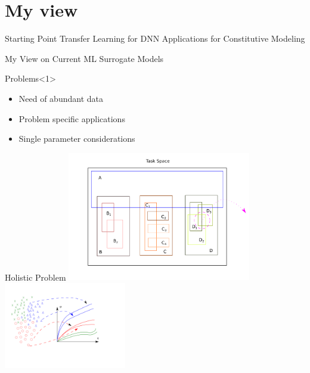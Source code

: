 \section{My view}

\begin{frame}{Starting Point}
  \centering
    \color{Pink} Transfer Learning for DNN Applications for Constitutive Modeling 
\end{frame}

\begin{frame}{My View on Current ML Surrogate Models}
\begin{minipage}{0.45\textwidth}
  \begin{block}{\color{White} Problems}<1>
    \begin{itemize}
      \item <1> Need of abundant data
      \item <1> Problem specific applications 
      \item <1> Single parameter considerations
    \end{itemize}
  \end{block} 
\end{minipage}%
\hspace{1cm}
\end{frame}

\begin{frame}{Holistic Problem}
\centering
\includegraphics[width=0.6\textwidth]{Figures/myview/tasks.pdf}\includegraphics[width=0.4\textwidth]{Figures/myview/task_space.pdf}
\end{frame}

